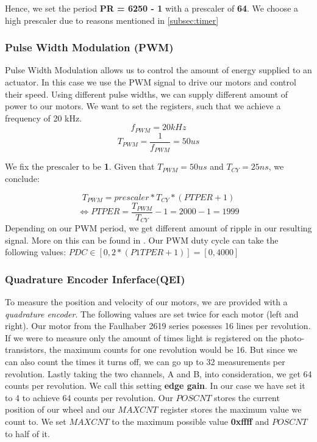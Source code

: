 Hence, we set the period \textbf{PR = 6250 - 1} with a prescaler of \textbf{64}. We choose a high prescaler due to reasons mentioned in \ref{subsec:timer}

\subsubsection*{Pulse Width Modulation (PWM)}

Pulse Width Modulation allows us to control the amount of energy supplied to an actuator. In this case we use the PWM signal to drive our motors and control their speed. Using different pulse widths, we can supply different amount of power to our motors. \cite{alex}
\vskip 0.1in
\noindent
We want to set the registers, such that we achieve a frequency of 20 kHz.
$$f_{PWM} = 20 kHz$$
$$T_{PWM} = \frac{1}{f_{PWM}} = 50 us$$

We fix the prescaler to be \textbf{1}. Given that $T_{PWM} = 50 us$ and $T_{CY}=25 ns$, we conclude:

$$T_{PWM} = prescaler * T_{CY} * (PTPER + 1)$$
$$\iff PTPER = \frac{T_{PWM}}{T_{CY}} - 1  = 2000 - 1 = 1999$$
\vskip 0.1in
\noindent
Depending on our PWM period, we get different amount of ripple in our resulting signal. More on this can be found in \cite[Chapter~5.1]{alex}.
\vskip 0.1in
\noindent
Our PWM duty cycle can take the following values: $PDC \in [0, 2*(P1TPER + 1)] = [0, 4000]$


\subsubsection*{Quadrature Encoder Inferface(QEI)}
To measure the position and velocity of our motors, we are provided with a \textit{quadrature encoder}.
The following values are set twice for each motor (left and right).
\vskip 0.1in
\noindent
Our motor from the Faulhaber 2619 series posesses 16 lines per revolution. If we were to measure only the amount of times light is registered on the photo-transistors, the maximum counts for one revolution would be 16. But since we can also count the times it turns off, we can go up to 32 measurements per revolution. Lastly taking the two channels, A and B, into consideration, we get 64 counts per revolution.
\vskip 0.1in
\noindent
We call this setting \textbf{edge gain}. In our case we have set it to 4 to achieve 64 counts per revolution.
\vskip 0.1in
\noindent
Our $POSCNT$ stores the current position of our wheel and our $MAXCNT$ register stores the maximum value we count to.
\vskip 0.1in
\noindent
We set $MAXCNT$ to the maximum possible value \textbf{0xffff} and $POSCNT$ to half of it.


